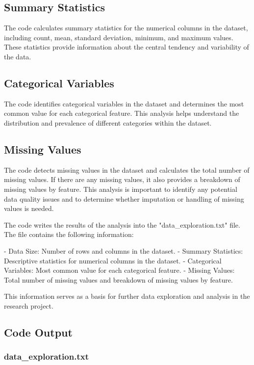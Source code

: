 \documentclass[11pt]{article}
\begin{document}
\subsection{Summary Statistics}
The code calculates summary statistics for the numerical columns in the dataset, including count, mean, standard deviation, minimum, and maximum values. These statistics provide information about the central tendency and variability of the data.

\subsection{Categorical Variables}
The code identifies categorical variables in the dataset and determines the most common value for each categorical feature. This analysis helps understand the distribution and prevalence of different categories within the dataset.

\subsection{Missing Values}
The code detects missing values in the dataset and calculates the total number of missing values. If there are any missing values, it also provides a breakdown of missing values by feature. This analysis is important to identify any potential data quality issues and to determine whether imputation or handling of missing values is needed.

The code writes the results of the analysis into the "data\_exploration.txt" file. The file contains the following information:

- Data Size: Number of rows and columns in the dataset.
- Summary Statistics: Descriptive statistics for numerical columns in the dataset.
- Categorical Variables: Most common value for each categorical feature.
- Missing Values: Total number of missing values and breakdown of missing values by feature.

This information serves as a basis for further data exploration and analysis in the research project.

\subsection{Code Output}

\subsubsection*{data\_exploration.txt}
\end{document}
